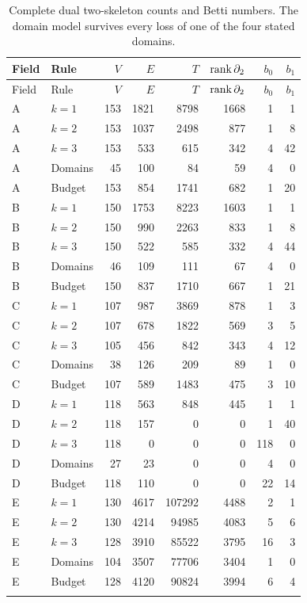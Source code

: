 \begin{longtable}{llrrrrrr}
\caption{Complete dual two-skeleton counts and Betti numbers. The domain model survives every loss of one of the four stated domains.}\label{tab:all-results}\\
\toprule Field & Rule & $V$ & $E$ & $T$ & $\operatorname{rank}\partial_2$ & $b_0$ & $b_1$ \\ \midrule\endfirsthead
\toprule Field & Rule & $V$ & $E$ & $T$ & $\operatorname{rank}\partial_2$ & $b_0$ & $b_1$ \\ \midrule\endhead
\bottomrule\endfoot
A & $k=1$ & 153 & 1821 & 8798 & 1668 & 1 & 1 \\
A & $k=2$ & 153 & 1037 & 2498 & 877 & 1 & 8 \\
A & $k=3$ & 153 & 533 & 615 & 342 & 4 & 42 \\
A & Domains & 45 & 100 & 84 & 59 & 4 & 0 \\
A & Budget & 153 & 854 & 1741 & 682 & 1 & 20 \\
\addlinespace
B & $k=1$ & 150 & 1753 & 8223 & 1603 & 1 & 1 \\
B & $k=2$ & 150 & 990 & 2263 & 833 & 1 & 8 \\
B & $k=3$ & 150 & 522 & 585 & 332 & 4 & 44 \\
B & Domains & 46 & 109 & 111 & 67 & 4 & 0 \\
B & Budget & 150 & 837 & 1710 & 667 & 1 & 21 \\
\addlinespace
C & $k=1$ & 107 & 987 & 3869 & 878 & 1 & 3 \\
C & $k=2$ & 107 & 678 & 1822 & 569 & 3 & 5 \\
C & $k=3$ & 105 & 456 & 842 & 343 & 4 & 12 \\
C & Domains & 38 & 126 & 209 & 89 & 1 & 0 \\
C & Budget & 107 & 589 & 1483 & 475 & 3 & 10 \\
\addlinespace
D & $k=1$ & 118 & 563 & 848 & 445 & 1 & 1 \\
D & $k=2$ & 118 & 157 & 0 & 0 & 1 & 40 \\
D & $k=3$ & 118 & 0 & 0 & 0 & 118 & 0 \\
D & Domains & 27 & 23 & 0 & 0 & 4 & 0 \\
D & Budget & 118 & 110 & 0 & 0 & 22 & 14 \\
\addlinespace
E & $k=1$ & 130 & 4617 & 107292 & 4488 & 2 & 1 \\
E & $k=2$ & 130 & 4214 & 94985 & 4083 & 5 & 6 \\
E & $k=3$ & 128 & 3910 & 85522 & 3795 & 16 & 3 \\
E & Domains & 104 & 3507 & 77706 & 3404 & 1 & 0 \\
E & Budget & 128 & 4120 & 90824 & 3994 & 6 & 4 \\
\addlinespace
\end{longtable}
